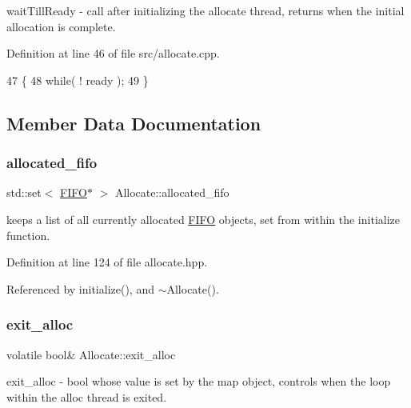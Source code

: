 wait\+Till\+Ready -\/ call after initializing the allocate thread, returns when the initial allocation is complete. 

Definition at line 46 of file src/allocate.\+cpp.


\begin{DoxyCode}
47 \{
48    \textcolor{keywordflow}{while}( ! ready );
49 \}
\end{DoxyCode}


\subsection{Member Data Documentation}
\hypertarget{class_allocate_a037410210c0d10578f87de1ec68f47ba}{}\label{class_allocate_a037410210c0d10578f87de1ec68f47ba} 
\subsubsection{\texorpdfstring{allocated\+\_\+fifo}{allocated\_fifo}}
{\footnotesize\ttfamily std\+::set$<$ \hyperlink{class_f_i_f_o}{F\+I\+FO}$\ast$ $>$ Allocate\+::allocated\+\_\+fifo\hspace{0.3cm}{\ttfamily [protected]}}

keeps a list of all currently allocated \hyperlink{class_f_i_f_o}{F\+I\+FO} objects, set from within the initialize function. 

Definition at line 124 of file allocate.\+hpp.



Referenced by initialize(), and $\sim$\+Allocate().

\hypertarget{class_allocate_a4d10076b88ab1297c89b8a05e117b510}{}\label{class_allocate_a4d10076b88ab1297c89b8a05e117b510} 
\subsubsection{\texorpdfstring{exit\+\_\+alloc}{exit\_alloc}}
{\footnotesize\ttfamily volatile bool\& Allocate\+::exit\+\_\+alloc\hspace{0.3cm}{\ttfamily [protected]}}

exit\+\_\+alloc -\/ bool whose value is set by the map object, controls when the loop within the alloc thread is exited. 

